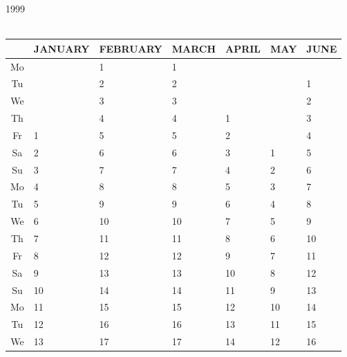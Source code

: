 \documentclass[a4paper]{article}
\newcommand{\monthstrut}{\rule{0pt}{12pt}}
\newcommand{\datestrut}{\rule{0pt}{12pt}}
\begin{document}
\thispagestyle{empty}
\begin{table}
\hspace{1cm} {\LARGE 1999}\\
{\ } \\
\begin{tabular}{|c||p{2.5cm}|p{2.5cm}|p{2.5cm}|p{2.5cm}|p{2.5cm}|p{2.5cm}|}
\hline
   \multicolumn{1}{|c||}{\monthstrut\ } &
   \multicolumn{1}{|c|}{JANUARY} &
   \multicolumn{1}{|c|}{FEBRUARY} &
   \multicolumn{1}{|c|}{MARCH} &
   \multicolumn{1}{|c|}{APRIL} &
   \multicolumn{1}{|c|}{MAY} &
   \multicolumn{1}{|c|}{JUNE} \\
\hline
\hline
\datestrut Mo &     &1    & 1   &     &       &      \\
\cline{1-1}\cline{3-4}\cline{7-7}
\datestrut Tu &     &2    & 2   &     &       & 1     \\
\cline{1-1}\cline{3-4}\cline{7-7}
\datestrut We &     &3    & 3   &     &       & 2     \\
\cline{1-1}\cline{3-5}\cline{7-7}
\datestrut Th &     &4    & 4   & 1   &       & 3     \\
\cline{1-5}\cline{7-7}
\datestrut Fr & 1   &5    & 5   & 2   &       & 4     \\
\cline{1-7}
\datestrut Sa & 2   &6    & 6   & 3   & 1     & 5     \\
\hline
\datestrut Su & 3   &7    & 7   & 4   & 2     & 6     \\
\hline\hline
\datestrut Mo & 4   &8    & 8   & 5   & 3     & 7     \\
\hline
\datestrut Tu & 5   &9    & 9   & 6   & 4     & 8     \\
\hline
\datestrut We & 6   &10   & 10  & 7   & 5     & 9     \\
\hline
\datestrut Th & 7   &11   & 11  & 8   & 6     & 10    \\
\hline
\datestrut Fr & 8   &12   & 12  & 9   & 7     & 11    \\
\hline
\datestrut Sa & 9   &13   & 13  & 10  & 8     & 12    \\
\hline
\datestrut Su & 10  &14   & 14  & 11  & 9     & 13    \\
\hline \hline
\datestrut Mo & 11  &15   & 15  & 12  & 10    & 14    \\
\hline
\datestrut Tu & 12  &16   & 16  & 13  & 11    & 15    \\
\hline
\datestrut We & 13  &17   & 17  & 14  & 12    & 16    \\

\end{tabular}
\end{table}
\end{document}
